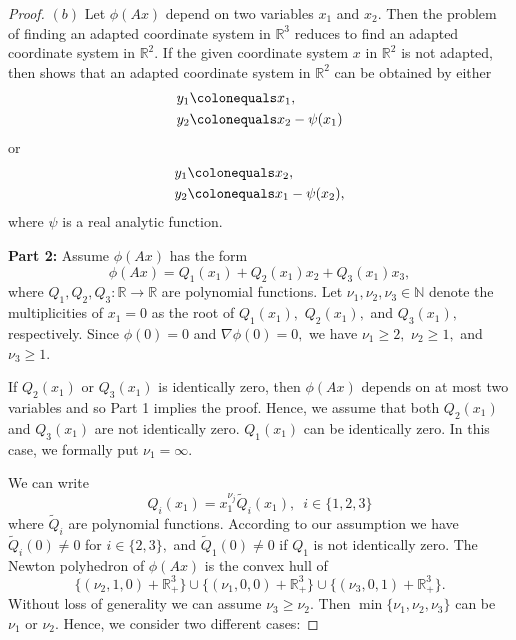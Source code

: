 \documentclass[a4paper, 11pt]{article}
\theoremstyle{plain}
\theoremstyle{definition}
\theoremstyle{lemma}
\theoremstyle{Remark}
\theoremstyle{proposition}
\theoremstyle{corollary}
\theoremstyle{example}
\theoremstyle{assumption}
\begin{document}
\begin{proof}
$(b)$ Let $ \phi(Ax)$ depend on two variables   $x_1$ and $x_2.$ Then the problem of finding an adapted coordinate system in $\mathbb{R}^3$ reduces to find  an adapted coordinate system in  $\mathbb{R}^2.$    If the given coordinate system $x$ in $\mathbb{R}^2$ is not adapted, then \cite[Theorem 4.2]{Adap} shows that an adapted coordinate system in $\mathbb{R}^2$ can be obtained by either \begin{align*}
y_1&\colonequals x_1,\\
y_2& \colonequals x_2-\psi(x_1)
\end{align*}
or
\begin{align*}
y_1&\colonequals x_2,\\
y_2&\colonequals x_1-\psi(x_2),
\end{align*}
where  $\psi$ is a real analytic function.


\bigskip
\textbf{Part 2:} Assume  $ \phi(Ax)$ has the form
\begin{equation*}
\phi(Ax)=Q_1(x_1)+Q_2(x_1)x_2+Q_3(x_1)x_3,
\end{equation*}
where $Q_1, Q_2, Q_3:\mathbb{R}\to \mathbb{R}$ are polynomial functions.
Let $\nu_1,\nu_2,\nu_3\in \mathbb{N}$   denote the multiplicities of $x_1=0$ as the root  of $Q_1(x_1),$ $Q_2(x_1),$ and $Q_3(x_1),$ respectively.  Since $\phi(0)=0$ and $\nabla \phi(0)=0,$ we have  $\nu_1\geq 2,$ $\nu_2\geq 1,
$ and $\nu_3\geq 1.$

If  $Q_2(x_1)$ or  $Q_3(x_1)$ is identically zero, then $\phi(Ax)$ depends on at most two variables and so Part 1  implies the proof. Hence, we assume that both $Q_2(x_1)$ and $Q_3(x_1)$ are not identically zero. $Q_1(x_1)$ can be identically zero. In this case, we formally put $\nu_1=\infty$.

 We can write
$$Q_i(x_1)= x_1^{\nu_j}\tilde Q_i(x_1),\,\,\,i\in\{1,2,3\} $$
where $\tilde Q_i$ are polynomial functions. According to our assumption we have $\tilde Q_i(0)\neq 0$    for $i\in \{2,3\},$ and $\tilde Q_1(0)\neq 0$  if  $Q_1$ is not identically zero.
The Newton polyhedron of $\phi(Ax)$ is the convex hull of
$$\{(\nu_2,1,0)+\mathbb{R}_+^3\}\cup \{(\nu_1,0,0)+\mathbb{R}_+^3\} \cup \{(\nu_3,0,1)+\mathbb{R}_+^3\}.$$
Without loss of generality we can assume $\nu_3\geq \nu_2.$  Then  $\min\{\nu_1,\nu_2,\nu_3\}$  can be $\nu_1$ or $\nu_2.$
Hence, we consider two different cases:



\end{proof}
\end{document}
